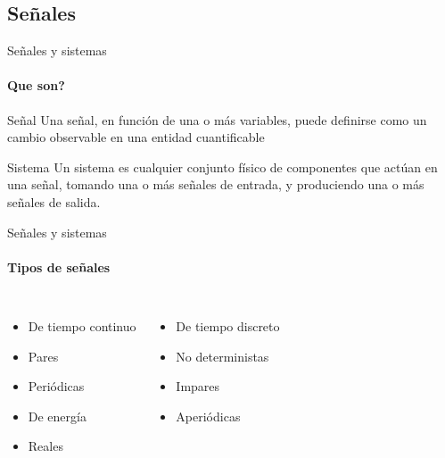 \begin{darkframes}
    \subsection{Señales}
    \begin{frame}{Señales y sistemas}
      \framesubtitle{Que son?}
      \begin{block}{Señal}
         Una señal, en función de una o más variables, puede definirse como un cambio observable en una entidad cuantificable
      \end{block}
      \begin{block}{Sistema}
         Un sistema es cualquier conjunto físico de componentes que actúan en una señal, tomando una o más señales de entrada, y produciendo una o más señales de salida.
      \end{block}
    \end{frame}
    \begin{frame}{Señales y sistemas}
      \framesubtitle{Tipos de señales}
      \begin{columns}[onlytextwidth]
            \begin{itemize}
               \item{De tiempo continuo}
               \item{Pares}
               \item{Periódicas}
               \item{De energía}
               \item{Reales}
            \end{itemize}
            \begin{itemize}
               \item{De tiempo discreto}
               \item{No deterministas}
               \item{Impares}
               \item{Aperiódicas}

\end{itemize}
\end{columns}
\end{frame}
\end{darkframes}
